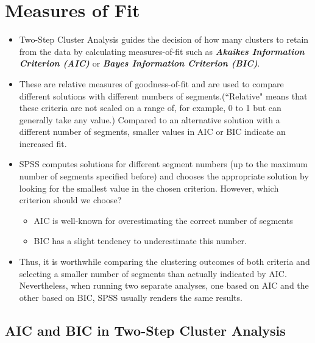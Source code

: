 \documentclass[a4paper,12pt]{article}
\begin{document}
\section{Measures of Fit}
\begin{itemize}
	\item Two-Step Cluster Analysis guides the decision of how many clusters to retain from the data by
	calculating measures-of-fit such as \textbf{\textit{Akaikes Information Criterion (AIC)}} or \textbf{\textit{Bayes Information Criterion (BIC)}}.
	
	\item These are relative measures of goodness-of-fit and are used to compare different
	solutions with different numbers of segments.(``Relative" means that these criteria
	are not scaled on a range of, for example, 0 to 1 but can generally take any value.)
	Compared to an alternative solution with a different number of segments, smaller
	values in AIC or BIC indicate an increased fit.
	
\item SPSS computes solutions for different segment numbers (up to the maximum number of segments specified before) and
chooses the appropriate solution by looking for the smallest value in the chosen
criterion. However, which criterion should we choose?
\begin{itemize}
	\item AIC is well-known for
	overestimating the correct number of segments
	\item BIC has a slight tendency
	to underestimate this number.
\end{itemize}

	
	\item Thus, it is worthwhile comparing the clustering
	outcomes of both criteria and selecting a smaller number of segments than
	actually indicated by AIC. Nevertheless, when running two separate analyses,
	one based on AIC and the other based on BIC, SPSS usually renders the same
	results. 
\end{itemize}





\subsection{AIC and BIC in Two-Step Cluster Analysis}
\end{document}
